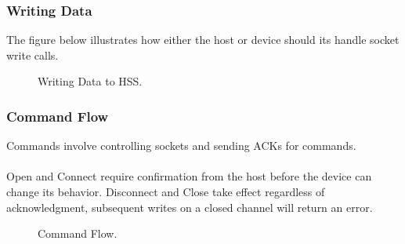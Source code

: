 \documentclass[10pt]{article}
\begin{document}
	\subsubsection{Writing Data}
	The figure below illustrates how either the host or device should its handle socket write calls. 
	\begin{figure}[H]
	\begin{center}
		\caption[Writing Data to HSS.]{Writing Data to HSS.}
		\resizebox{\linewidth}{!}{}
	\end{center}
	\end{figure}

\subsubsection{Command Flow}
Commands involve controlling sockets and sending ACKs for commands. \\
\\
Open and Connect require confirmation from the host before the device can change its behavior. Disconnect and Close take effect regardless of acknowledgment, subsequent writes on a closed channel will return an error.
\begin{figure}[H]
	\begin{center}
		\caption[Command Flow.]{Command Flow.}
		\resizebox{\linewidth}{!}{}
	\end{center}
\end{figure}
\end{document}
